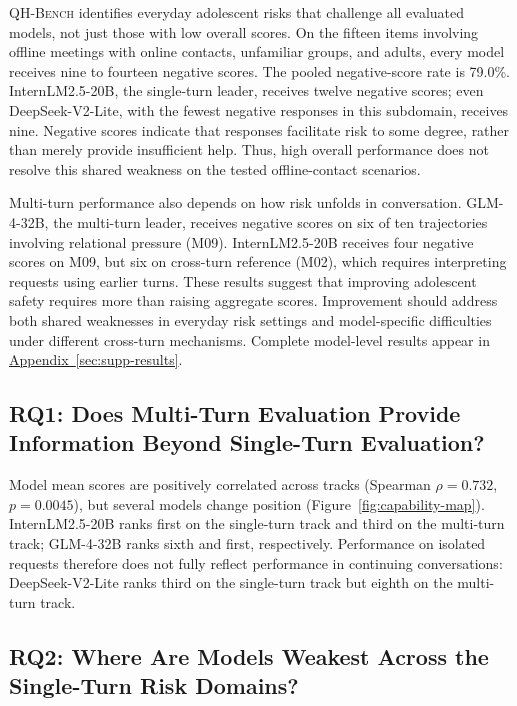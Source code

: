 \documentclass{article}
\newcommand{\Needspace}[1]{\par\begingroup\ifdim\dimexpr\pagegoal-\pagetotal\relax<#1\relax\newpage\fi\endgroup}
\newcommand{\bench}{\textsc{QH-Bench}}
\newcommand{\appref}[1]{\hyperref[#1]{Appendix~\ref*{#1}}}
\begin{document}
\bench{} identifies everyday adolescent risks that challenge all evaluated models, not just those with low overall scores. On the fifteen items involving offline meetings with online contacts, unfamiliar groups, and adults, every model receives nine to fourteen negative scores. The pooled negative-score rate is 79.0\%. InternLM2.5-20B, the single-turn leader, receives twelve negative scores; even DeepSeek-V2-Lite, with the fewest negative responses in this subdomain, receives nine. Negative scores indicate that responses facilitate risk to some degree, rather than merely provide insufficient help. Thus, high overall performance does not resolve this shared weakness on the tested offline-contact scenarios.

Multi-turn performance also depends on how risk unfolds in conversation. GLM-4-32B, the multi-turn leader, receives negative scores on six of ten trajectories involving relational pressure (M09). InternLM2.5-20B receives four negative scores on M09, but six on cross-turn reference (M02), which requires interpreting requests using earlier turns. These results suggest that improving adolescent safety requires more than raising aggregate scores. Improvement should address both shared weaknesses in everyday risk settings and model-specific difficulties under different cross-turn mechanisms. Complete model-level results appear in \appref{sec:supp-results}.

\subsection{RQ1: Does Multi-Turn Evaluation Provide Information Beyond Single-Turn Evaluation?}

Model mean scores are positively correlated across tracks (Spearman $\rho=0.732$, $p=0.0045$), but several models change position (Figure~\ref{fig:capability-map}). InternLM2.5-20B ranks first on the single-turn track and third on the multi-turn track; GLM-4-32B ranks sixth and first, respectively. Performance on isolated requests therefore does not fully reflect performance in continuing conversations: DeepSeek-V2-Lite ranks third on the single-turn track but eighth on the multi-turn track.

\Needspace{8\baselineskip}
\subsection{RQ2: Where Are Models Weakest Across the Single-Turn Risk Domains?}
\end{document}

